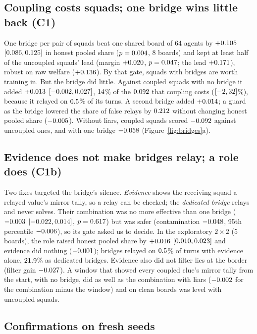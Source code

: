\documentclass{article}
\begin{document}
\subsection{Coupling costs squads; one bridge wins little back (C1)}
\label{sec:c1}

One bridge per pair of squads beat one shared board of 64 agents by $+0.105$ $[0.086, 0.125]$ in honest pooled share ($p = 0.004$, 8 boards) and kept at least half of the uncoupled squads' lead (margin $+0.020$, $p = 0.047$; the lead $+0.171$), robust on raw welfare ($+0.136$). By that gate, squads with bridges are worth training in. But the bridge did little. Against coupled squads with no bridge it added $+0.013$ $[-0.002, 0.027]$, $14$\% of the $0.092$ that coupling costs ($[-2, 32]$\%), because it relayed on $0.5$\% of its turns. A second bridge added $+0.014$; a guard as the bridge lowered the share of false relays by $0.212$ without changing honest pooled share ($-0.005$). Without liars, coupled squads scored $-0.092$ against uncoupled ones, and with one bridge $-0.058$ (Figure~\ref{fig:bridges}a).

\subsection{Evidence does not make bridges relay; a role does (C1b)}
\label{sec:c1b}

Two fixes targeted the bridge's silence. \emph{Evidence} shows the receiving squad a relayed value's mirror tally, so a relay can be checked; the \emph{dedicated bridge} relays and never solves. Their combination was no more effective than one bridge ($-0.003$ $[-0.022, 0.014]$, $p = 0.617$) but was safer (contamination $-0.048$, 95th percentile $-0.006$), so its gate asked us to decide. In the exploratory $2\times 2$ (5 boards), the role raised honest pooled share by $+0.016$ $[0.010, 0.023]$ and evidence did nothing ($-0.001$); bridges relayed on $0.5$\% of turns with evidence alone, $21.9$\% as dedicated bridges. Evidence also did not filter lies at the border (filter gain $-0.027$). A window that showed every coupled clue's mirror tally from the start, with no bridge, did as well as the combination with liars ($-0.002$ for the combination minus the window) and on clean boards was level with uncoupled squads.

\subsection{Confirmations on fresh seeds}
\label{sec:confirm}
\end{document}
